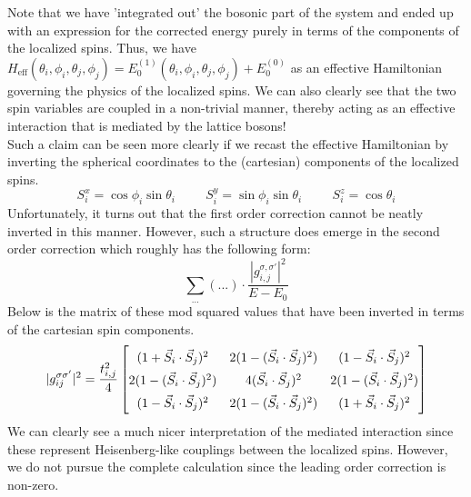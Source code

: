 Note that we have 'integrated out' the bosonic part of the system and ended up with an expression for the corrected energy purely in terms of the components of the localized spins. Thus, we have $H_{\text{eff}}({\theta_i, \phi_i, \theta_j, \phi_j}) = E_0^{(1)}(\theta_i, \phi_i, \theta_j, \phi_j) + E_0^{(0)}$ as an effective Hamiltonian governing the physics of the localized spins. We can also clearly see that the two spin variables are coupled in a non-trivial manner, thereby acting as an effective interaction that is mediated by the lattice bosons! 
\vspace{0.5cm}\\
Such a claim can be seen more clearly if we recast the effective Hamiltonian by inverting the spherical coordinates to the (cartesian) components of the localized spins.
\begin{equation}
    S_i^x = \cos\phi_i\sin\theta_i \hspace{1cm} S_i^y = \sin\phi_i\sin\theta_i \hspace{1cm} S_i^z = \cos\theta_i
\end{equation}
Unfortunately, it turns out that the first order correction cannot be neatly inverted in this manner. However, such a structure does emerge in the second order correction which roughly has the following form:
$$\sum_{\dots}(...) \cdot \frac{|g_{i, j}^{\sigma,\sigma'}|^2}{E - E_0}$$
Below is the matrix of these mod squared values that have been inverted in terms of the cartesian spin components.
\begin{equation}
    |g_{ij}^{\sigma\sigma'}|^2 = 
\begingroup
\renewcommand*{\arraystretch}{1.5}
\frac{t_{i, j}^2}{4}\begin{bmatrix}
    (1 + \vec{S}_i \cdot \vec{S}_j)^2 & 2(1 - (\vec{S}_i \cdot \vec{S}_j)^2) & (1 - \vec{S}_i \cdot \vec{S}_j)^2 \\ 
    2(1 - (\vec{S}_i \cdot \vec{S}_j)^2) & 4(\vec{S}_i \cdot \vec{S}_j)^2 & 2(1 - (\vec{S}_i \cdot \vec{S}_j)^2) \\
    (1 - \vec{S}_i \cdot \vec{S}_j)^2 & 2(1 - (\vec{S}_i \cdot \vec{S}_j)^2) & (1 + \vec{S}_i \cdot \vec{S}_j)^2
\end{bmatrix}
\endgroup
\end{equation}   
We can clearly see a much nicer interpretation of the mediated interaction since these represent Heisenberg-like couplings between the localized spins. However, we do not pursue the complete calculation since the leading order correction is non-zero.

